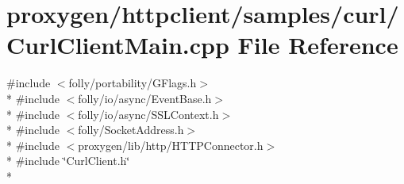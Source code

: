 \section{proxygen/httpclient/samples/curl/\+Curl\+Client\+Main.cpp File Reference}
\label{CurlClientMain_8cpp}
{\ttfamily \#include $<$folly/portability/\+G\+Flags.\+h$>$}\\*
{\ttfamily \#include $<$folly/io/async/\+Event\+Base.\+h$>$}\\*
{\ttfamily \#include $<$folly/io/async/\+S\+S\+L\+Context.\+h$>$}\\*
{\ttfamily \#include $<$folly/\+Socket\+Address.\+h$>$}\\*
{\ttfamily \#include $<$proxygen/lib/http/\+H\+T\+T\+P\+Connector.\+h$>$}\\*
{\ttfamily \#include \char`\"{}Curl\+Client.\+h\char`\"{}}\\*
